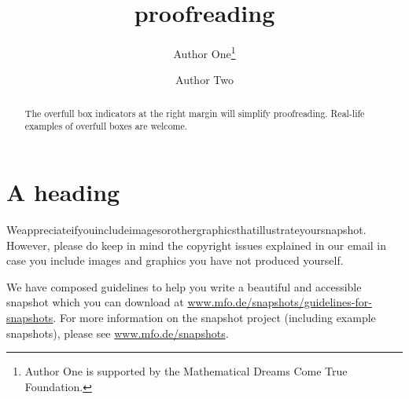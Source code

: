 \documentclass{snapshotmfo}
\author{Author One\thanks{Author One is supported by the Mathematical Dreams Come True Foundation.} \and Author Two}
\title{proofreading}
\begin{document}
\begin{abstract}
The overfull box indicators at the right margin will simplify proofreading. Real-life examples of overfull boxes
are welcome.
\end{abstract}

\section{A heading}
Weappreciateifyouincludeimagesorothergraphicsthatillustrateyoursnapshot. However, please do keep in mind the copyright issues explained in our email in case you include images and graphics you have not produced yourself.

We have composed guidelines to help you write a beautiful and accessible snapshot which you can download at \href{http://www.mfo.de/snapshots/guidelines-for-snapshots}{\hbox{www.mfo.de/snapshots/guidelines-for-snapshots}}. For more information on the snapshot project (including example snapshots), please see \href{http://www.mfo.de/snapshots}{www.mfo.de/snapshots}.
\end{document}
